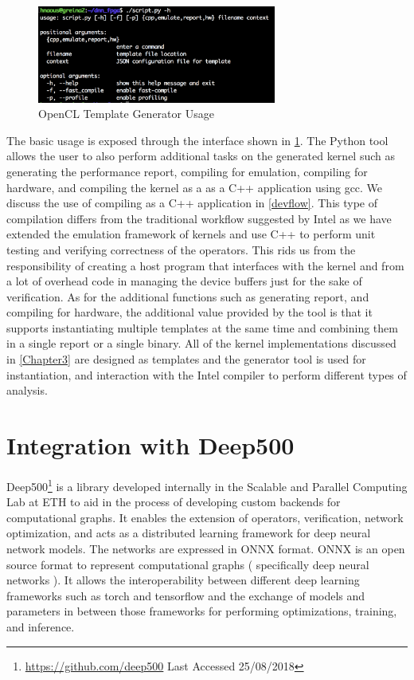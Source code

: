 \begin{figure}[h!]
\centering
\includegraphics[width=0.7\textwidth]{Figures/usage}
\decoRule
\caption[Tempate Generator Usage]{ OpenCL Template Generator Usage }
\label{fig:usage}
\end{figure}

The basic usage is exposed through the interface shown in \ref{fig:usage}. The Python tool allows the user to also perform additional tasks on the generated kernel such as generating the performance report, compiling for emulation, compiling for hardware, and compiling the kernel as a as a C++ application using gcc. We discuss the use of compiling   as a C++ application in \ref{devflow}. This type of compilation differs from the traditional workflow suggested by Intel as we have extended the emulation framework of kernels and use C++ to perform unit testing and verifying correctness of the operators. This rids us from the responsibility of creating a host program that interfaces with the kernel and from a lot of overhead code in managing the device buffers just for the sake of verification. 
As for the additional functions such as generating report, and compiling for hardware, the additional value provided by the tool is that it supports instantiating multiple templates at the same time and combining them in a single report or a single binary. All of the kernel implementations discussed in \ref{Chapter3} are designed as templates and the generator tool is used for instantiation, and interaction with the Intel compiler to perform different types of analysis.

\section{Integration with Deep500}

Deep500\footnote{\url{https://github.com/deep500} Last Accessed 25/08/2018} is a library developed internally in the Scalable and Parallel Computing Lab at ETH to aid in the process of developing custom backends for computational graphs. It enables the extension of operators, verification, network optimization, and acts as a distributed learning framework for deep neural network models. The networks are expressed in ONNX\citep{onnx} format. ONNX is an open source format to represent computational graphs ( specifically deep neural networks ). It allows the interoperability between different deep learning frameworks such as torch\cite{torch} and tensorflow\cite{tensorflow} and the exchange of models and parameters in between those frameworks for performing optimizations, training, and inference. 

